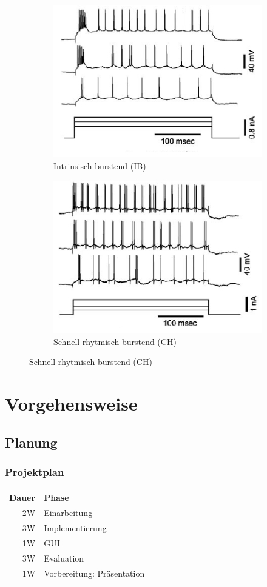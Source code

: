\begin{frame}
  \begin{figure}
    \begin{subfigure}{.5\textwidth}
      \centering
      \includegraphics*[width=0.7\linewidth]{genetic/nowak-ib.png}
      \caption*{Intrinsisch burstend (IB)}
    \end{subfigure}%
    \begin{subfigure}{.5\textwidth}
      \centering
      \includegraphics*[width=0.7\linewidth]{genetic/nowak-ch.png}
      \caption*{Schnell rhytmisch burstend (CH)}
    \end{subfigure}
  \end{figure}
\end{frame}


\section{Vorgehensweise}

\subsection{Planung}

\begin{frame}
  \frametitle{Projektplan}

  \begin{tabular}[H]{rl}
    Dauer & Phase \\ \hline
    2W & Einarbeitung \\
    3W & Implementierung \\
    1W & GUI \\
    3W & Evaluation \\
    1W & Vorbereitung: Präsentation
  \end{tabular}
\end{frame}

